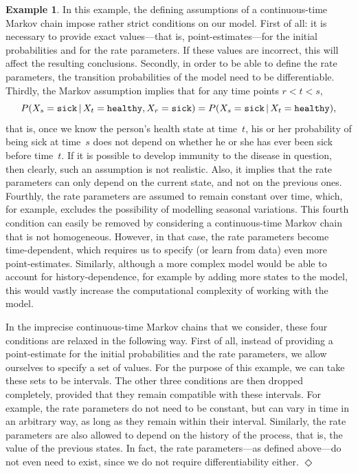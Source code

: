 \documentclass[10pt,a4paper]{paper}
\theoremstyle{definition}
\newtheorem{exmp}{Example}
\newcommand{\exampleend}{\hfill$\Diamond$}
\begin{document}
\begin{exmp}
In this example, the defining assumptions of a continuous-time Markov chain impose rather strict conditions on our model. 
First of all: it is necessary to provide exact values---that is, point-estimates---for the initial probabilities and for the rate parameters. If these values are incorrect, this will affect the resulting conclusions.
Secondly, in order to be able to define the rate parameters, the transition probabilities of the model need to be differentiable.
Thirdly, the Markov assumption implies that for any time points $r<t<s$,
\begin{equation*}
P(X_s={\tt sick}\,\vert\, X_t={\tt healthy}, X_r={\tt sick}) = P(X_s={\tt sick}\,\vert\, X_t={\tt healthy}),
\end{equation*}
that is, once we know the person's health state at time~$t$, his or her probability of being sick at time~$s$ does not depend on whether he or she has ever been sick before time~$t$. If it is possible to develop immunity to the disease in question, then clearly, such an assumption is not realistic. Also, it implies that the rate parameters can only depend on the current state, and not on the previous ones.
Fourthly, the rate parameters are assumed to remain constant over time, which, for example, excludes the possibility of modelling seasonal variations. This fourth condition can easily be removed by considering a continuous-time Markov chain that is not homogeneous. However, in that case, the rate parameters become time-dependent, which requires us to specify (or learn from data) even more point-estimates. Similarly, although a more complex model would be able to account for history-dependence, for example by adding more states to the model, this would vastly increase the computational complexity of working with the model. 

In the imprecise continuous-time Markov chains that we consider, these four conditions are relaxed in the following way. First of all, instead of providing a point-estimate for the initial probabilities and the rate parameters, we allow ourselves to specify a set of values. For the purpose of this example, we can take these sets to be intervals. The other three conditions are then dropped completely, provided that they remain compatible with these intervals. For example, the rate parameters do not need to be constant, but can vary in time in an arbitrary way, as long as they remain within their interval. Similarly, the rate parameters are also allowed to depend on the history of the process, that is, the value of the previous states. In fact, the rate parameters---as defined above---do not even need to exist, since we do not require differentiability either.
\exampleend\vspace{10pt}
\end{exmp}
\end{document}
